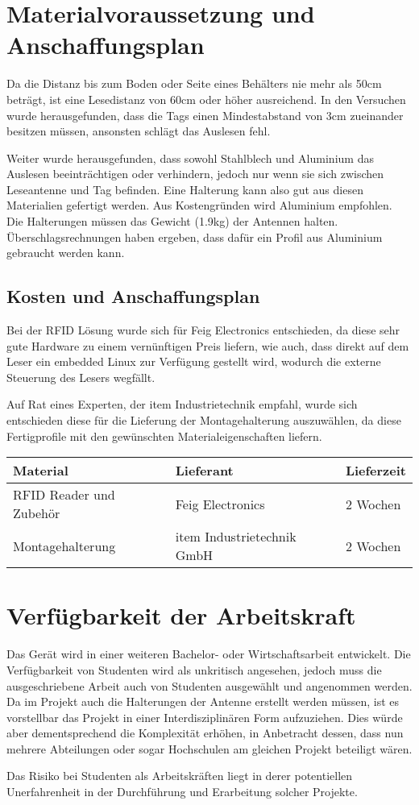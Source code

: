 \chapter{Materialvoraussetzung und Anschaffungsplan}
\label{sec:Materialvoraussetzung_Anschaffungsplan}
Da die Distanz bis zum Boden oder Seite eines Behälters nie mehr als 50cm beträgt, ist eine Lesedistanz von 60cm oder höher ausreichend. In den Versuchen wurde herausgefunden, dass die Tags einen Mindestabstand von 3cm zueinander besitzen müssen, ansonsten schlägt das Auslesen fehl.

Weiter wurde herausgefunden, dass sowohl Stahlblech und Aluminium das Auslesen beeinträchtigen oder verhindern, jedoch nur wenn sie sich zwischen Leseantenne und Tag befinden. Eine Halterung kann also gut aus diesen Materialien gefertigt werden. Aus Kostengründen wird Aluminium empfohlen. Die Halterungen müssen das Gewicht (1.9kg) der Antennen halten. Überschlagsrechnungen haben ergeben, dass dafür ein Profil aus Aluminium gebraucht werden kann.

\section{Kosten und Anschaffungsplan}
Bei der RFID Lösung wurde sich für Feig Electronics entschieden, da diese sehr gute Hardware zu einem vernünftigen Preis liefern, wie auch, dass direkt auf dem Leser ein embedded Linux zur Verfügung gestellt wird, wodurch die externe Steuerung des Lesers wegfällt.

Auf Rat eines Experten, der item Industrietechnik empfahl, wurde sich entschieden diese für die Lieferung der Montagehalterung auszuwählen, da diese Fertigprofile mit den gewünschten Materialeigenschaften liefern.

\begin{table}[h!]
	\centering
	\begin{tabularx}{\textwidth}{|X|X|X|}
		\hline
		\textbf{Material} & \textbf{Lieferant} & \textbf{Lieferzeit} \\
		\hline
		RFID Reader und Zubehör & Feig Electronics & 2 Wochen\\
		\hline
		Montagehalterung & item Industrietechnik GmbH & 2 Wochen\\
		\hline
	\end{tabularx}
\end{table}

\chapter{Verfügbarkeit der Arbeitskraft}
Das Gerät wird in einer weiteren Bachelor- oder Wirtschaftsarbeit entwickelt. Die Verfügbarkeit von Studenten wird als unkritisch angesehen, jedoch muss die ausgeschriebene Arbeit auch von Studenten ausgewählt und angenommen werden. Da im Projekt auch die Halterungen der Antenne erstellt werden müssen, ist es vorstellbar das Projekt in einer Interdisziplinären Form aufzuziehen. Dies würde aber dementsprechend die Komplexität erhöhen, in Anbetracht dessen, dass nun mehrere Abteilungen oder sogar Hochschulen am gleichen Projekt beteiligt wären.

Das Risiko bei Studenten als Arbeitskräften liegt in derer potentiellen Unerfahrenheit in der Durchführung und Erarbeitung solcher Projekte.
